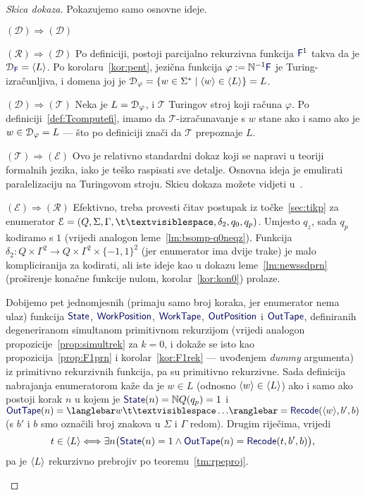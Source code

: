\begin{proof}[Skica dokaza] Pokazujemo samo osnovne ideje.
\begin{labeling}{$(\mathcal D)\Rightarrow(\mathcal D)$}
\item[$(\mathcal R)\Rightarrow(\mathcal D)$]
Po definiciji, postoji parcijalno rekurzivna funkcija $\f F^1$ takva da je $\dom{\f F}=\kr L$. Po korolaru~\ref{kor:pent}, jezična funkcija $\varphi:=\N^{-1}\f F$ je Turing-izračunljiva, i domena joj je $\mathcal D_{\varphi}=\{w\in\Sigma^*\mid\langle w\rangle\in\langle L\rangle\}=L$.

\item[$(\mathcal D)\Rightarrow(\mathcal T)$] 
Neka je $L=\mathcal D_{\varphi}$, i $\mathcal T$ Turingov stroj koji računa $\varphi$. Po definiciji~\ref{def:Tcomputefi}, imamo da $\mathcal T$-izračunavanje s $w$ stane ako i samo ako je $w\in\mathcal D_{\varphi}=L$ --- što po definiciji znači da $\mathcal T$ prepoznaje $L$.

\item[$(\mathcal T)\Rightarrow(\mathcal E)$] 
Ovo je relativno standardni dokaz koji se napravi u teoriji formalnih jezika, iako je teško raspisati sve detalje. Osnovna ideja je emulirati paralelizaciju na Turingovom stroju. Skicu dokaza možete vidjeti u~\cite[\emph{theorem}~3.21]{sipser}.

\item[$(\mathcal E)\Rightarrow(\mathcal R)$] 
Efektivno, treba provesti čitav postupak iz točke~\ref{sec:tikp} za enumerator $\mathcal E=(Q,\Sigma,\Gamma,\bl,\delta_2,q_0,q_p)$. Umjesto $q_z$, sada $q_p$ kodiramo s $1$ (vrijedi analogon leme~\ref{lm:bsomp-q0neqz}). Funkcija $\delta_2\colon Q\times\Gamma^2\to Q\times\Gamma^2\times\{-1,1\}^2$ (jer enumerator ima dvije trake) je malo kompliciranija za kodirati, ali iste ideje kao u dokazu leme~\ref{lm:newssdprn} (proširenje konačne funkcije nulom, korolar~\ref{kor:kon0}) prolaze.

Dobijemo pet jednomjesnih (primaju samo broj koraka, jer enumerator nema ulaz) funkcija $\f{State}$, $\f{WorkPosition}$, $\f{WorkTape}$, $\f{OutPosition}$ i $\f{OutTape}$, definiranih degeneriranom simultanom primitivnom rekurzijom (vrijedi analogon propozicije~\ref{prop:simultrek} za $k=0$, i dokaže se isto kao propozicija~\ref{prop:F1prn} i korolar~\ref{kor:F1rek} --- uvođenjem \emph{dummy} argumenta) iz primitivno rekurzivnih funkcija, pa su primitivno rekurzivne. Sada definicija nabrajanja enumeratorom kaže da je $w\in L$ (odnosno $\langle w\rangle\in\langle L\rangle$) ako i samo ako postoji korak $n$ u kojem je $\f{State}(n)=\N Q(q_p)=1$ i $\f{OutTape}(n)=\knk{w\bl\ldots}=\f{Recode}(\kr w,b',b)$ (s $b'$ i $b$ smo označili broj znakova u $\Sigma$ i $\Gamma$ redom). Drugim riječima, vrijedi
\begin{equation}
    t\in\kr L\Longleftrightarrow\exists n\bigl(\f{State}(n)=1\land\f{OutTape}(n)=\f{Recode}(t,b',b)\bigr)\text,
\end{equation}
pa je $\langle L\rangle$ rekurzivno prebrojiv po teoremu~\ref{tm:rpeproj}.\qedhere
\end{labeling}
\end{proof}
